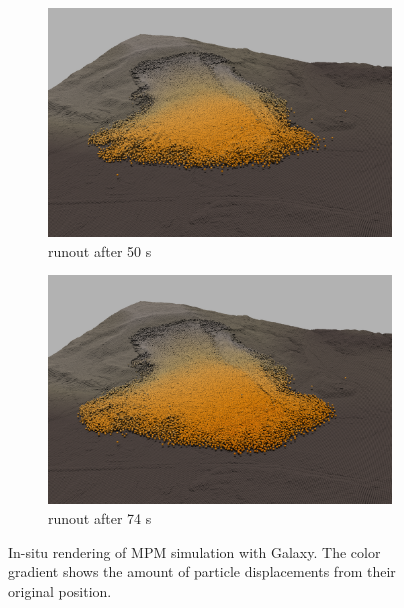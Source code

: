 \documentclass[journal]{IEEEtran}
\begin{document}
\begin{figure}[!tbp]
    \begin{subfigure}[b]{0.495\textwidth}
        \includegraphics[width=\textwidth]{figs/frame_1_00000.png}
        \caption{runout after 50 s}
        \label{fig:oso-50} 
    \end{subfigure}
    \begin{subfigure}[b]{0.495\textwidth}
        \includegraphics[width=\textwidth]{figs/frame_1_00243.png}
        \caption{runout after 74 s}
        \label{fig:oso-74} 
    \end{subfigure}
    \caption{In-situ rendering of MPM simulation with Galaxy. The color gradient shows the amount of particle displacements from their original position.}
    \label{fig:timing}
\end{figure}
\end{document}
